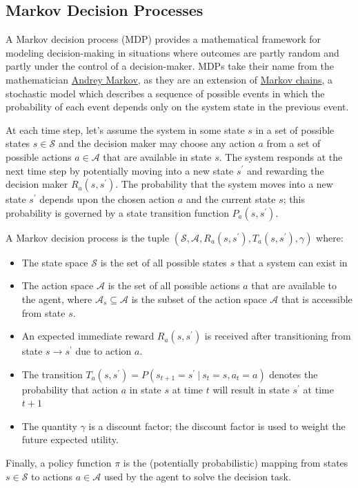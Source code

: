 \documentclass[11pt]{article}
\theoremstyle{definition}
\begin{document}
\subsection{Markov Decision Processes}
A Markov decision process (MDP) provides a mathematical framework for modeling decision-making in situations 
where outcomes are partly random and partly under the control of a decision-maker. 
MDPs take their name from the mathematician \href{https://en.wikipedia.org/wiki/Andrey_Markov}{Andrey Markov}, 
as they are an extension of \href{https://en.wikipedia.org/wiki/Markov_chain}{Markov chains}, 
a stochastic model which describes a sequence of possible events in which the probability of each event depends only on the 
system state in the previous event.

At each time step, let's assume the system in some state $s$ in a set of possible states $s\in\mathcal{S}$ and the decision maker 
may choose any action $a$ from a set of possible actions $a\in\mathcal{A}$ that are available in state $s$. 
The system responds at the next time step by potentially moving into a new state $s^{\prime}$ and rewarding the decision maker $R_{a}\left(s, s^{\prime}\right)$.
The probability that the system moves into a new state $s^{\prime}$ depends upon the chosen action $a$ and the current state $s$; 
this probability is governed by a state transition function $P_{a}\left(s,s^{\prime}\right)$.

\begin{definition}
A Markov decision process is the tuple $\left(\mathcal{S}, \mathcal{A}, R_{a}\left(s, s^{\prime}\right), T_{a}\left(s,s^{\prime}\right), \gamma\right)$ where:
\begin{itemize}
\item{The state space $\mathcal{S}$ is the set of all possible states $s$ that a system can exist in}
\item{The action space $\mathcal{A}$ is the set of all possible actions $a$ that are available to the agent, where $\mathcal{A}_{s} \subseteq \mathcal{A}$ is the subset of the action space $\mathcal{A}$ that is accessible from state $s$.}
\item{An expected immediate reward $R_{a}\left(s, s^{\prime}\right)$ is received after transitioning from state $s\rightarrow{s}^{\prime}$ due to action $a$.}
\item{The transition $T_{a}\left(s,s^{\prime}\right) = P(s_{t+1} = s^{\prime}~|~s_{t}=s,a_{t} = a)$ denotes the probability that action $a$ in state $s$ at time $t$ will result in state $s^{\prime}$ at time $t+1$}
\item{The quantity $\gamma$ is a discount factor; the discount factor is used to weight the future expected utility.}
\end{itemize}
Finally, a policy function $\pi$ is the (potentially probabilistic) mapping from states $s\in\mathcal{S}$ to actions $a\in\mathcal{A}$ used by the agent to solve the decision task. 
\end{definition}
\end{document}
